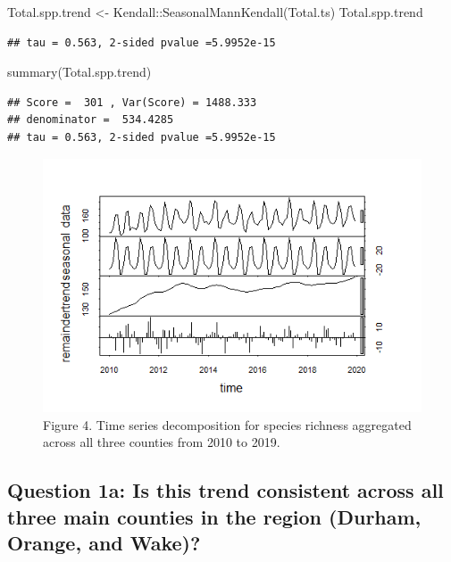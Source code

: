 \documentclass[
  12pt,
]{article}
\newenvironment{Shaded}{\begin{snugshade}}{\end{snugshade}}
\newcommand{\FunctionTok}[1]{\textcolor[rgb]{0.00,0.00,0.00}{#1}}
\newcommand{\NormalTok}[1]{#1}
\newcommand{\OtherTok}[1]{\textcolor[rgb]{0.56,0.35,0.01}{#1}}
\newcommand{\SpecialCharTok}[1]{\textcolor[rgb]{0.00,0.00,0.00}{#1}}
\begin{document}
\begin{Shaded}
\begin{Highlighting}[]
\NormalTok{Total.spp.trend }\OtherTok{\textless{}{-}}\NormalTok{ Kendall}\SpecialCharTok{::}\FunctionTok{SeasonalMannKendall}\NormalTok{(Total.ts) }
\NormalTok{Total.spp.trend}
\end{Highlighting}
\end{Shaded}

\begin{verbatim}
## tau = 0.563, 2-sided pvalue =5.9952e-15
\end{verbatim}

\begin{Shaded}
\begin{Highlighting}[]
\FunctionTok{summary}\NormalTok{(Total.spp.trend)}
\end{Highlighting}
\end{Shaded}

\begin{verbatim}
## Score =  301 , Var(Score) = 1488.333
## denominator =  534.4285
## tau = 0.563, 2-sided pvalue =5.9952e-15
\end{verbatim}

\begin{figure}
\centering
\includegraphics{./Output/RT_spp_ts_decomp.png}
\caption{Figure 4. Time series decomposition for species richness
aggregated across all three counties from 2010 to 2019.}
\end{figure}

\hypertarget{question-1a-is-this-trend-consistent-across-all-three-main-counties-in-the-region-durham-orange-and-wake}{%
\subsection{Question 1a: Is this trend consistent across all three main
counties in the region (Durham, Orange, and
Wake)?}\label{question-1a-is-this-trend-consistent-across-all-three-main-counties-in-the-region-durham-orange-and-wake}}
\end{document}
